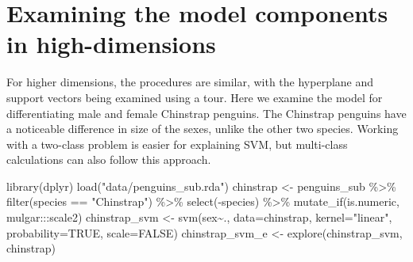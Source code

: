 \documentclass[
  letterpaper,
]{krantz}
\newenvironment{Shaded}{\begin{snugshade}}{\end{snugshade}}
\newcommand{\AttributeTok}[1]{\textcolor[rgb]{0.40,0.45,0.13}{#1}}
\newcommand{\ConstantTok}[1]{\textcolor[rgb]{0.56,0.35,0.01}{#1}}
\newcommand{\FunctionTok}[1]{\textcolor[rgb]{0.28,0.35,0.67}{#1}}
\newcommand{\NormalTok}[1]{\textcolor[rgb]{0.00,0.23,0.31}{#1}}
\newcommand{\OtherTok}[1]{\textcolor[rgb]{0.00,0.23,0.31}{#1}}
\newcommand{\SpecialCharTok}[1]{\textcolor[rgb]{0.37,0.37,0.37}{#1}}
\newcommand{\StringTok}[1]{\textcolor[rgb]{0.13,0.47,0.30}{#1}}
\begin{document}
\section{Examining the model components in
high-dimensions}\label{examining-the-model-components-in-high-dimensions}

For higher dimensions, the procedures are similar, with the hyperplane
and support vectors being examined using a tour. Here we examine the
model for differentiating male and female Chinstrap penguins. The
Chinstrap penguins have a noticeable difference in size of the sexes,
unlike the other two species. Working with a two-class problem is easier
for explaining SVM, but multi-class calculations can also follow this
approach.

\begin{Shaded}
\begin{Highlighting}[]
\FunctionTok{library}\NormalTok{(dplyr)}
\FunctionTok{load}\NormalTok{(}\StringTok{"data/penguins\_sub.rda"}\NormalTok{)}
\NormalTok{chinstrap }\OtherTok{\textless{}{-}}\NormalTok{ penguins\_sub }\SpecialCharTok{\%\textgreater{}\%}
  \FunctionTok{filter}\NormalTok{(species }\SpecialCharTok{==} \StringTok{"Chinstrap"}\NormalTok{) }\SpecialCharTok{\%\textgreater{}\%}
  \FunctionTok{select}\NormalTok{(}\SpecialCharTok{{-}}\NormalTok{species) }\SpecialCharTok{\%\textgreater{}\%}
  \FunctionTok{mutate\_if}\NormalTok{(is.numeric, mulgar}\SpecialCharTok{:::}\NormalTok{scale2)}
\NormalTok{chinstrap\_svm }\OtherTok{\textless{}{-}} \FunctionTok{svm}\NormalTok{(sex}\SpecialCharTok{\textasciitilde{}}\NormalTok{., }\AttributeTok{data=}\NormalTok{chinstrap, }
                     \AttributeTok{kernel=}\StringTok{"linear"}\NormalTok{,}
                     \AttributeTok{probability=}\ConstantTok{TRUE}\NormalTok{, }
                     \AttributeTok{scale=}\ConstantTok{FALSE}\NormalTok{)}
\NormalTok{chinstrap\_svm\_e }\OtherTok{\textless{}{-}} \FunctionTok{explore}\NormalTok{(chinstrap\_svm, chinstrap)}
\end{Highlighting}
\end{Shaded}
\end{document}
